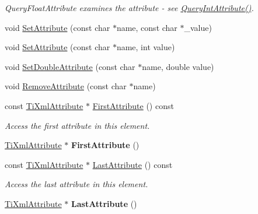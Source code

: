 \begin{DoxyCompactItemize}
\begin{DoxyCompactList}\small\item\em QueryFloatAttribute examines the attribute -\/ see \hyperlink{class_ti_xml_element_aea0bfe471380f281c5945770ddbf52b9}{QueryIntAttribute()}. \item\end{DoxyCompactList}\item 
void \hyperlink{class_ti_xml_element_abf0b3bd7f0e4c746a89ec6e7f101fc32}{SetAttribute} (const char $\ast$name, const char $\ast$\_\-value)
\item 
void \hyperlink{class_ti_xml_element_ace6f4be75e373726d4774073d666d1a7}{SetAttribute} (const char $\ast$name, int value)
\item 
void \hyperlink{class_ti_xml_element_a0d1dd975d75496778177e35abfe0ec0b}{SetDoubleAttribute} (const char $\ast$name, double value)
\item 
void \hyperlink{class_ti_xml_element_a56979767deca794376b1dfa69a525b2a}{RemoveAttribute} (const char $\ast$name)
\item 
\hypertarget{class_ti_xml_element_a516054c9073647d6cb29b6abe9fa0592}{
const \hyperlink{class_ti_xml_attribute}{TiXmlAttribute} $\ast$ \hyperlink{class_ti_xml_element_a516054c9073647d6cb29b6abe9fa0592}{FirstAttribute} () const }
\label{class_ti_xml_element_a516054c9073647d6cb29b6abe9fa0592}

\begin{DoxyCompactList}\small\item\em Access the first attribute in this element. \item\end{DoxyCompactList}\item 
\hypertarget{class_ti_xml_element_a4b33780fc565d38d6b54f640e0cf1737}{
\hyperlink{class_ti_xml_attribute}{TiXmlAttribute} $\ast$ {\bfseries FirstAttribute} ()}
\label{class_ti_xml_element_a4b33780fc565d38d6b54f640e0cf1737}

\item 
\hypertarget{class_ti_xml_element_a86191b49f9177be132b85b14655f1381}{
const \hyperlink{class_ti_xml_attribute}{TiXmlAttribute} $\ast$ \hyperlink{class_ti_xml_element_a86191b49f9177be132b85b14655f1381}{LastAttribute} () const }
\label{class_ti_xml_element_a86191b49f9177be132b85b14655f1381}

\begin{DoxyCompactList}\small\item\em Access the last attribute in this element. \item\end{DoxyCompactList}\item 
\hypertarget{class_ti_xml_element_a222f81cf06155cd108f2a68d4d176004}{
\hyperlink{class_ti_xml_attribute}{TiXmlAttribute} $\ast$ {\bfseries LastAttribute} ()}
\label{class_ti_xml_element_a222f81cf06155cd108f2a68d4d176004}


\end{DoxyCompactItemize}

